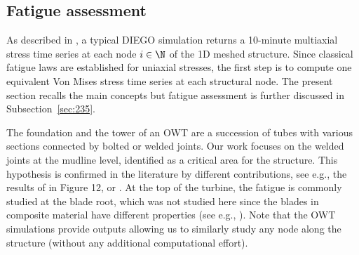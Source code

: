 \subsection{Fatigue assessment}
As described in , a typical DIEGO simulation returns a 10-minute multiaxial stress time series at each node $i \in \N$ of the 1D meshed structure. 
Since classical fatigue laws are established for uniaxial stresses, the first step is to compute one equivalent Von Mises stress time series at each structural node.
The present section recalls the main concepts but fatigue assessment is further discussed in Subsection~\ref{sec:235}. 

The foundation and the tower of an OWT are a succession of tubes with various sections connected by bolted or welded joints. 
Our work focuses on the welded joints at the mudline level, identified as a critical area for the structure. 
This hypothesis is confirmed in the literature by different contributions, see e.g., the results of \citet{muller_cheng_2018} in Figure 12, or \citet{katsikogiannis_2021_owt_fatigue}. 
At the top of the turbine, the fatigue is commonly studied at the blade root, which was not studied here since the blades in composite material have different properties (see e.g., \citealp{dimitrov_2013}). 
Note that the OWT simulations provide outputs allowing us to similarly study any node along the structure (without any additional computational effort).


